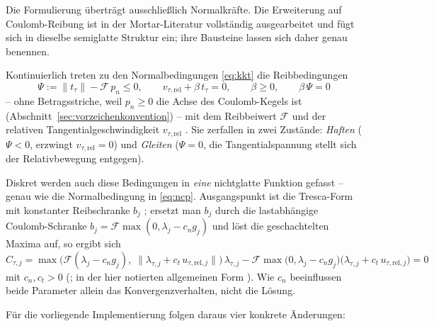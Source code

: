 \documentclass[a4paper,11pt]{article}
\def\bm#1{#1}%
\def\tilde#1{#1}%
\begin{document}
Die Formulierung überträgt ausschließlich Normalkräfte. Die Erweiterung auf Coulomb-Reibung ist in
der Mortar-Literatur vollständig ausgearbeitet und fügt sich in dieselbe semiglatte Struktur ein;
ihre Bausteine lassen sich daher genau benennen.

Kontinuierlich treten zu den Normalbedingungen \eqref{eq:kkt} die Reibbedingungen
\begin{equation}
\Psi := \|\bm t_\tau\| - \mathcal F\,p_n \le 0,
\qquad
\bm v_{\tau,\text{rel}} + \beta\,\bm t_\tau = \bm 0,
\qquad
\beta \ge 0,
\qquad
\beta\,\Psi = 0
\label{eq:coulomb}
\end{equation}
-- ohne Betragsstriche, weil $p_n\ge0$ die Achse des Coulomb-Kegels ist
(Abschnitt~\ref{sec:vorzeichenkonvention}) -- mit dem Reibbeiwert $\mathcal F$ und der relativen Tangentialgeschwindigkeit
$\bm v_{\tau,\text{rel}}$ \citep[Gl.~(10)--(13), S.~546--547]{gitterle}. Sie zerfallen in zwei
Zustände: \emph{Haften} ($\Psi<0$, erzwingt $\bm v_{\tau,\text{rel}}=\bm 0$) und \emph{Gleiten}
($\Psi=0$, die Tangentialspannung stellt sich der Relativbewegung entgegen).

Diskret werden auch diese Bedingungen in \emph{eine} nichtglatte Funktion gefasst -- genau wie die
Normalbedingung in \eqref{eq:ncp}. Ausgangspunkt ist die Tresca-Form mit konstanter Reibschranke
$b_j$ \citep[Gl.~(58)]{gitterle}; ersetzt man $b_j$ durch die lastabhängige Coulomb-Schranke
$b_j=\mathcal F\max(0,\lambda_j-c_n\tilde g_j)$ \citep[Gl.~(60)]{gitterle} und löst die
geschachtelten Maxima auf, so ergibt sich
\begin{equation}
C_{\tau,j} = \max\!\big(\mathcal F(\lambda_j-c_n\tilde g_{j}),\;
\|\bm\lambda_{\tau,j}+c_t\,\tilde{\bm u}_{\tau,\text{rel},j}\|\big)\,\bm\lambda_{\tau,j}
- \mathcal F\max\!\big(0,\lambda_j-c_n\tilde g_{j}\big)
\big(\bm\lambda_{\tau,j}+c_t\,\tilde{\bm u}_{\tau,\text{rel},j}\big) = \bm 0
\label{eq:ncptau}
\end{equation}
mit $c_n,c_t>0$ (\citealp[Gl.~(61)/(62)]{gitterle}; in der hier notierten allgemeinen Form
\citealp[Gl.~(3.60)/(3.61)]{farah}). Wie $c_n$ beeinflussen beide Parameter allein das
Konvergenzverhalten, nicht die Lösung.

Für die vorliegende Implementierung folgen daraus vier konkrete Änderungen:
\end{document}
